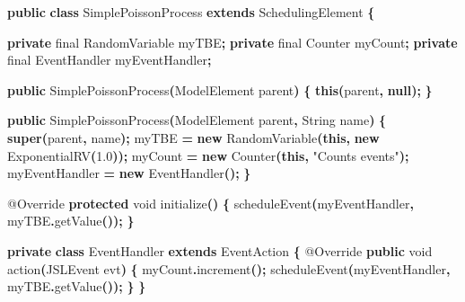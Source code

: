 \documentclass[
]{book}
\newenvironment{Shaded}{\begin{snugshade}}{\end{snugshade}}
\newcommand{\AttributeTok}[1]{\textcolor[rgb]{0.77,0.63,0.00}{#1}}
\newcommand{\BuiltInTok}[1]{#1}
\newcommand{\DataTypeTok}[1]{\textcolor[rgb]{0.13,0.29,0.53}{#1}}
\newcommand{\FloatTok}[1]{\textcolor[rgb]{0.00,0.00,0.81}{#1}}
\newcommand{\FunctionTok}[1]{\textcolor[rgb]{0.00,0.00,0.00}{#1}}
\newcommand{\KeywordTok}[1]{\textcolor[rgb]{0.13,0.29,0.53}{\textbf{#1}}}
\newcommand{\NormalTok}[1]{#1}
\newcommand{\OperatorTok}[1]{\textcolor[rgb]{0.81,0.36,0.00}{\textbf{#1}}}
\newcommand{\StringTok}[1]{\textcolor[rgb]{0.31,0.60,0.02}{#1}}
\theoremstyle{definition}
\theoremstyle{definition}
\theoremstyle{definition}
\theoremstyle{definition}
\theoremstyle{remark}
\begin{document}
\begin{Shaded}
\begin{Highlighting}[]
\KeywordTok{public} \KeywordTok{class}\NormalTok{ SimplePoissonProcess }\KeywordTok{extends}\NormalTok{ SchedulingElement }\OperatorTok{\{}

    \KeywordTok{private} \DataTypeTok{final}\NormalTok{ RandomVariable myTBE}\OperatorTok{;}
    \KeywordTok{private} \DataTypeTok{final}\NormalTok{ Counter myCount}\OperatorTok{;}
    \KeywordTok{private} \DataTypeTok{final} \BuiltInTok{EventHandler}\NormalTok{ myEventHandler}\OperatorTok{;}

    \KeywordTok{public} \FunctionTok{SimplePoissonProcess}\OperatorTok{(}\NormalTok{ModelElement parent}\OperatorTok{)} \OperatorTok{\{}
        \KeywordTok{this}\OperatorTok{(}\NormalTok{parent}\OperatorTok{,} \KeywordTok{null}\OperatorTok{);}
    \OperatorTok{\}}

    \KeywordTok{public} \FunctionTok{SimplePoissonProcess}\OperatorTok{(}\NormalTok{ModelElement parent}\OperatorTok{,} \BuiltInTok{String}\NormalTok{ name}\OperatorTok{)} \OperatorTok{\{}
        \KeywordTok{super}\OperatorTok{(}\NormalTok{parent}\OperatorTok{,}\NormalTok{ name}\OperatorTok{);}
\NormalTok{        myTBE }\OperatorTok{=} \KeywordTok{new} \FunctionTok{RandomVariable}\OperatorTok{(}\KeywordTok{this}\OperatorTok{,} \KeywordTok{new} \FunctionTok{ExponentialRV}\OperatorTok{(}\FloatTok{1.0}\OperatorTok{));}
\NormalTok{        myCount }\OperatorTok{=} \KeywordTok{new} \FunctionTok{Counter}\OperatorTok{(}\KeywordTok{this}\OperatorTok{,} \StringTok{"Counts events"}\OperatorTok{);}
\NormalTok{        myEventHandler }\OperatorTok{=} \KeywordTok{new} \BuiltInTok{EventHandler}\OperatorTok{();}
    \OperatorTok{\}}

    \AttributeTok{@Override}
    \KeywordTok{protected} \DataTypeTok{void} \FunctionTok{initialize}\OperatorTok{()} \OperatorTok{\{}
        \FunctionTok{scheduleEvent}\OperatorTok{(}\NormalTok{myEventHandler}\OperatorTok{,}\NormalTok{ myTBE}\OperatorTok{.}\FunctionTok{getValue}\OperatorTok{());}
    \OperatorTok{\}}

    \KeywordTok{private} \KeywordTok{class} \BuiltInTok{EventHandler} \KeywordTok{extends}\NormalTok{ EventAction }\OperatorTok{\{}
        \AttributeTok{@Override}
        \KeywordTok{public} \DataTypeTok{void} \FunctionTok{action}\OperatorTok{(}\NormalTok{JSLEvent evt}\OperatorTok{)} \OperatorTok{\{}
\NormalTok{            myCount}\OperatorTok{.}\FunctionTok{increment}\OperatorTok{();}
            \FunctionTok{scheduleEvent}\OperatorTok{(}\NormalTok{myEventHandler}\OperatorTok{,}\NormalTok{ myTBE}\OperatorTok{.}\FunctionTok{getValue}\OperatorTok{());}
        \OperatorTok{\}}
    \OperatorTok{\}}


\end{Highlighting}
\end{Shaded}
\end{document}
